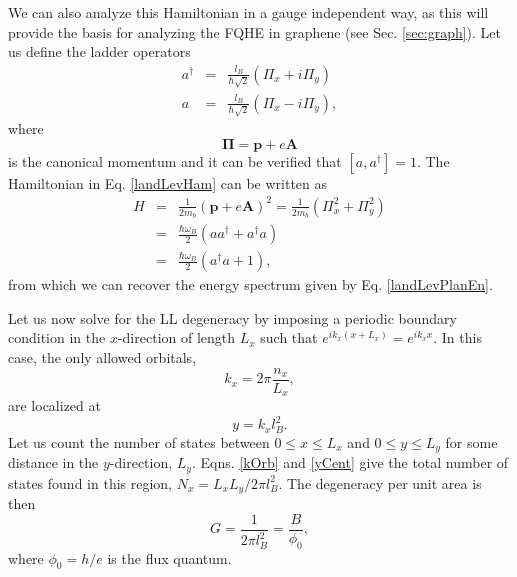     We can also analyze this Hamiltonian in a gauge independent way, as this will provide the basis for analyzing the FQHE in graphene (see Sec. \ref{sec:graph}). Let us define the ladder operators
    \begin{eqnarray}
    a^\dagger &=& \frac{l_B}{\hbar\sqrt{2}}\left(\Pi_x + i\Pi_y\right)\\
    a &=&\frac{l_B}{\hbar\sqrt{2}}\left(\Pi_x - i\Pi_y\right),
    \end{eqnarray}
    where 
    \begin{equation}\label{eq:can_mom}
    \mathbf{\Pi} = \mathbf{p} + e\mathbf{A} 
    \end{equation}
    is the canonical momentum and it can be verified that $[a,a^\dagger]=1$. The Hamiltonian in Eq. \ref{landLevHam} can be written as
    \begin{eqnarray}
    H &=&\frac{1}{2m_b}\left(\textbf{p}+e\textbf{A}\right)^2 = \frac{1}{2m_b}\left(\Pi_x^2 + \Pi_y^2\right)\\
    &=&\frac{\hbar \omega_B}{2}(aa^\dagger + a^\dagger a)\\
    &=&\frac{\hbar\omega_B}{2}\left(a^\dagger a + 1\right),
    \end{eqnarray}
    from which we can recover the energy spectrum given by Eq. \ref{landLevPlanEn}.
    
    Let us now solve for the LL degeneracy by imposing a periodic boundary condition in the $x$-direction of length $L_x$ such that $e^{ik_x(x+L_x)}=e^{ik_xx}$. In this case, the only allowed orbitals,
    \begin{equation} \label{kOrb}
    k_x=2\pi\frac{n_x}{L_x},
    \end{equation}
    are localized at
    \begin{equation} \label{yCent}
    y=k_xl_B^2. 
    \end{equation}
    Let us count the number of states between $0\leq x\leq L_x$ and $0\leq y\leq L_y$ for some distance in the $y$-direction, $L_y$. Eqns. \ref{kOrb} and \ref{yCent} give the total number of states found in this region, $N_x=L_xL_y/2\pi l_B^2$. The degeneracy per unit area is then
    \begin{equation} \label{degUnAr}
    G=\frac{1}{2\pi l_B^2}=\frac{B}{\phi_0}, 
    \end{equation}
    where $\phi_0=h/e$ is the flux quantum. 
    
